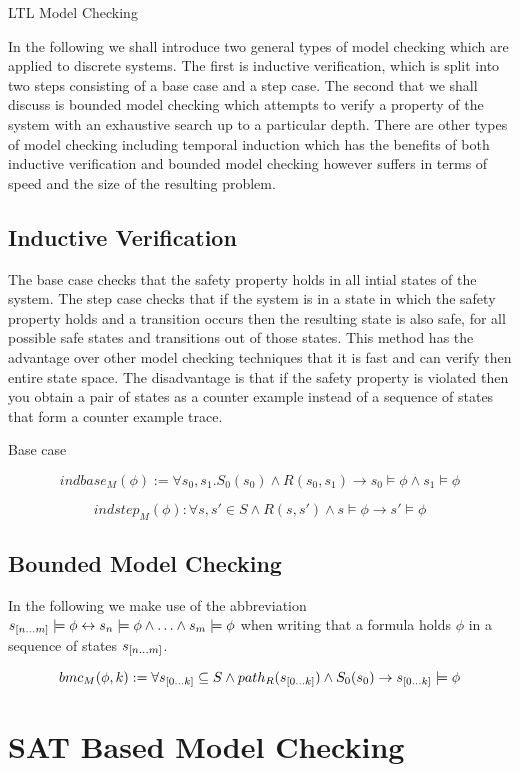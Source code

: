 LTL Model Checking


In the following we shall introduce two general types of model checking which are applied to discrete systems. The first is inductive verification, which is split into two steps consisting of a base case and a step case.   The second that we shall discuss is bounded model checking which attempts to verify a property of the system with an exhaustive search up to a particular depth. There are other types of model checking including temporal induction which has the benefits of both inductive verification and bounded model checking however suffers in terms of speed and the size of the resulting problem.

\subsection*{Inductive Verification}


The base case checks that the safety property holds in all intial states of the system. The step case checks that if the system is in a state in which the safety property holds and a transition occurs then the resulting state is also safe, for all possible safe states and transitions out of those states. This method has the advantage over other model checking techniques that it is fast and can verify then entire state space. The disadvantage is that if the safety property is violated then you obtain a pair of states as a counter example instead of a sequence of states that form a counter example trace.

Base case

$$indbase_M(\phi)  := \forall s_0,s_1. S_0(s_0) \wedge R(s_0, s_1) \to s_0 \models \phi \wedge s_1 \models \phi$$

$$indstep_M(\phi) : \forall s,s' \in S \wedge R(s, s') \wedge s \models \phi  \to s' \models \phi$$
\subsection*{Bounded Model Checking}

In the following we make use of the abbreviation $s_{{[}n \ldots m {]}} \models \phi \leftrightarrow s_n \models \phi \wedge \ldots \wedge  s_m \models \phi$ when writing that a formula holds $\phi$ in a sequence of states $s_{{[}n \ldots m {]}}$.

\begin{mydef}

$$bmc_M(\phi,k):= \forall s_{{[}0 \ldots k {]}} \subseteq S \wedge  path_R(s_{{[}0 \ldots k {]}}) \wedge S_0(s_0) \to s_{{[}0 \ldots k {]}} \models \phi$$
\end{mydef}


\section{SAT Based Model Checking}